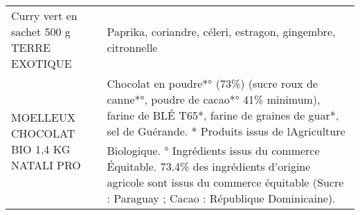 \begin{longtable}{p{5cm}p{10cm}}
                                                                Curry vert en sachet 500 g TERRE EXOTIQUE &                                                                                                                                                                                                                                                                                                                                                                                                                                                                                                                                                                                                                                                                                                                                                                                                                                                                                                                                                                             Paprika, coriandre, céleri, estragon, gingembre, citronnelle \\
                                                                  MOELLEUX CHOCOLAT BIO 1,4 KG NATALI PRO &                                                                                                                                                                                                                                                                                                                                                                                                                                                                                                                                                                                                                                                            Chocolat en poudre*° (73\%) (sucre roux de canne*°, poudre de cacao*° 41\% minimum), farine de BLÉ T65*, farine de graines de guar*, sel de Guérande.  * Produits issus de lAgriculture Biologique.  ° Ingrédients issus du commerce Équitable. 73.4\% des ingrédients d'origine agricole sont issus du commerce équitable (Sucre : Paraguay ; Cacao : République Dominicaine). \\

\end{longtable}
